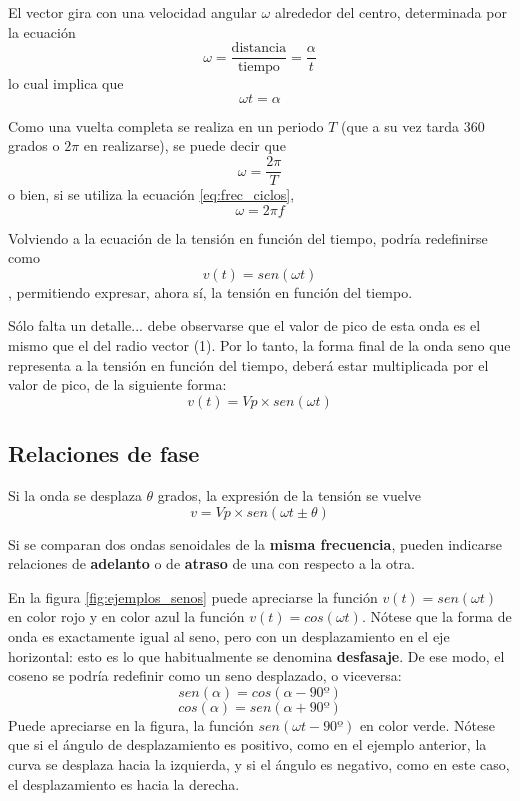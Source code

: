 El vector gira con una velocidad angular $\omega$ alrededor del centro, determinada por la ecuación $$\omega = \frac{\text{distancia}}{\text{tiempo}}= \frac{\alpha}{t}$$ lo cual implica que $$ \omega t = \alpha $$

Como una vuelta completa se realiza en un periodo $T$ (que a su vez tarda 360 grados o $2 \pi$ en realizarse), se puede decir que 
$$\omega = \frac{2\pi}{T}$$ o bien, si se utiliza la ecuación \ref{eq:frec_ciclos}, $$\omega = 2\pi f$$

Volviendo a la ecuación de la tensión en función del tiempo, podría redefinirse como $$v(t) = sen (\omega t)$$, permitiendo expresar, ahora sí, la tensión en función del tiempo.

Sólo falta un detalle... debe observarse que el valor de pico de esta onda es el mismo que el del radio vector (1). Por lo tanto, la forma final de la onda seno que representa a la tensión en función del tiempo, deberá estar multiplicada por el valor de pico, de la siguiente forma: 
\begin{equation}
	\label{eq:senoidal}
	v(t) = Vp \times sen(\omega t)
\end{equation}

\subsection{Relaciones de fase}
Si la onda se desplaza $\theta$ grados, la expresión de la tensión se vuelve 
$$v=Vp \times sen (\omega t \pm \theta ) $$

Si se comparan dos ondas senoidales de la \textbf{misma frecuencia}, pueden indicarse relaciones de \textbf{adelanto} o de \textbf{atraso} de una con respecto a la otra.

\begin{ejemplo}
	En la figura \ref{fig:ejemplos_senos} puede apreciarse la función $v(t)=sen(\omega t)$ en color rojo y en color azul la función $v(t)=cos(\omega t)$. Nótese que la forma de onda es exactamente igual al seno, pero con un desplazamiento en el eje horizontal: esto es lo que habitualmente se denomina \textbf{desfasaje}. De ese modo, el coseno se podría redefinir como un seno desplazado, o viceversa: $$ sen(\alpha) = cos(\alpha - 90º) $$ $$ cos(\alpha) = sen(\alpha + 90º) $$
	Puede apreciarse en la figura, la función $sen(\omega t -90º)$ en color verde. Nótese que si el ángulo de desplazamiento es positivo, como en el ejemplo anterior, la curva se desplaza hacia la izquierda, y si el ángulo es negativo, como en este caso, el desplazamiento es hacia la derecha.
\end{ejemplo}

